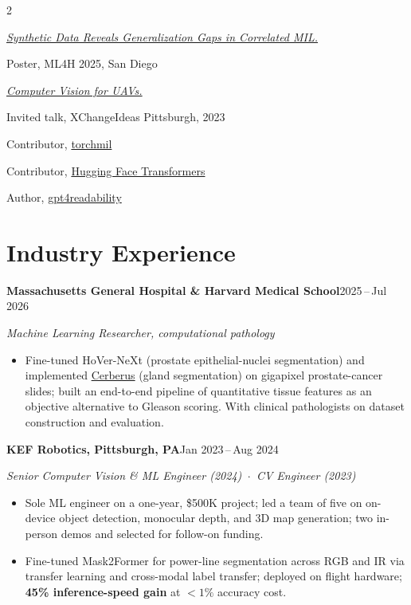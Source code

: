 \documentclass[9pt,letterpaper]{extarticle}
\newcommand{\sidesection}[1]{%
  \vspace{6pt}{\color{accent}\normalsize\bfseries #1}\par
  \vspace{1pt}{\color{rule}\rule{\linewidth}{0.4pt}}\par\vspace{3pt}}
\newcommand{\role}[2]{\noindent\textbf{\small #1}\hfill{\color{meta}\footnotesize #2}\par}
\newcommand{\sub}[1]{\noindent\textit{\footnotesize\color{meta} #1}\par}
\begin{document}
\begin{paracol}{2}
\sidesection{Talks}
{\footnotesize\raggedright
\href{https://arxiv.org/abs/2510.25759}{\textit{Synthetic Data Reveals Generalization Gaps in Correlated MIL.}}\par
{\color{meta}Poster, ML4H 2025, San Diego}\par\vspace{3pt}

\href{https://xchangepgh2023.sched.com/event/1LdC7/an-interactive-exploration-of-computer-vision-for-unmanned-aerial-vehicles-uavs}{\textit{Computer Vision for UAVs.}}\par
{\color{meta}Invited talk, XChangeIdeas Pittsburgh, 2023\par}}

\sidesection{Open Source}
{\footnotesize\raggedright
Contributor, \href{https://github.com/Franblueee/torchmil}{torchmil}\par\vspace{1pt}
Contributor, \href{https://github.com/huggingface/transformers}{Hugging Face Transformers}\par\vspace{1pt}
Author, \href{https://github.com/loevlie/gpt4readability}{gpt4readability}\par}

\switchcolumn


\section{Industry Experience}

\role{Massachusetts General Hospital \& Harvard Medical School}{2025\,--\,Jul 2026}
\sub{Machine Learning Researcher, computational pathology}
\begin{itemize}
  \item Fine-tuned HoVer-NeXt (prostate epithelial-nuclei segmentation) and implemented \href{https://github.com/TissueImageAnalytics/cerberus}{Cerberus} (gland segmentation) on gigapixel prostate-cancer slides; built an end-to-end pipeline of quantitative tissue features as an objective alternative to Gleason scoring. With clinical pathologists on dataset construction and evaluation.
\end{itemize}

\role{KEF Robotics, Pittsburgh, PA}{Jan 2023\,--\,Aug 2024}
\sub{Senior Computer Vision \& ML Engineer (2024) \,$\cdot$\, CV Engineer (2023)}
\begin{itemize}
  \item Sole ML engineer on a one-year, \$500K project; led a team of five on on-device object detection, monocular depth, and 3D map generation; two in-person demos and selected for follow-on funding.
  \item Fine-tuned Mask2Former for power-line segmentation across RGB and IR via transfer learning and cross-modal label transfer; deployed on flight hardware; \textbf{45\% inference-speed gain} at $<\!1\%$ accuracy cost.
\end{itemize}


\end{paracol}
\end{document}

